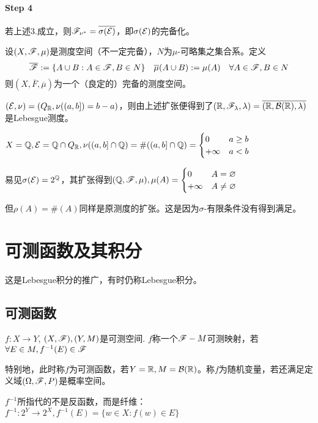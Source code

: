 \documentclass{ctexbook}
\begin{document}
\paragraph{Step 4}
\begin{Thm}
  若上述3.成立，则$\mathscr{F}_{\nu^{*}}=\overline{\sigma(\mathcal{E})}$，即$\sigma(\mathcal{E})$的完备化。
\end{Thm}

\begin{Thm}[完备化定理]
  设$(X,\mathscr{F},\mu)$是测度空间（不一定完备），$N$为$\mu$-可略集之集合系。定义
  \[\overline{\mathscr{F}}:=\{A\cup B:A\in\mathscr{F}, B\in N\}\quad  \overline{\mu}(A\cup B):=\mu(A)\quad\forall A\in\mathscr{F}, B\in N\]
  则$(X,\overline{F},\overline{\mu})$为一个（良定的）完备的测度空间。
\end{Thm}

\begin{comment}
\begin{Prop}
  $(\E,\nu)$是半环及其上的预测度，则$\nu^{*}|_{\E}=\nu$。
\end{Prop}
\end{comment}

\begin{Eg}
  $(\mathcal{E},\nu)=(Q_{\mathbb{R}},\nu((a,b])=b-a)$，则由上述扩张便得到了$(\mathbb{R},\mathscr{F}_{\lambda},\lambda)=\overline{(\mathbb{R},\mathcal{B}(\mathbb{R}),\lambda)}$是Lebesgue测度。
\end{Eg}

\begin{Eg}
  $X=\mathbb{Q}, \mathcal{E}=\mathbb{Q}\cap Q_{\mathbb{R}},\nu((a,b]\cap \mathbb{Q})=\#((a,b]\cap\mathbb{Q})=
  \begin{cases}
    0& a\geq b\\+\infty&a<b
  \end{cases}  $

  易见$\sigma(\mathcal{E})=2^{\mathbb{Q}}$，其扩张得到$(\mathbb{Q},\mathscr{F},\mu),\mu(A)=
  \begin{cases}
    0&A=\varnothing\\+\infty &A\neq\varnothing
  \end{cases}  $

  但$\rho(A)=\#(A)$同样是原测度的扩张。这是因为$\sigma$-有限条件没有得到满足。
\end{Eg}

\section{可测函数及其积分}

这是Lebesgue积分的推广，有时仍称Lebesgue积分。
\subsection{可测函数}
\begin{Def}[可测映射]
  $f:X\to Y$, $(X,\mathscr{F}),(Y,M)$是可测空间. $f$称一个$\mathscr{F}-M$可测映射，若$\forall E\in M, f^{-1}(E)\in\mathscr{F}$

  特别地，此时称$f$为可测函数，若$Y=\mathbb{R},M=\mathcal{B}(\mathbb{R})$。称$f$为随机变量，若还满足定义域$(\Omega, \mathscr{F},P)$是概率空间。
\end{Def}
\begin{Rmk}
  $f^{-1}$所指代的不是反函数，而是纤维：$f^{-1}:2^{Y}\to 2^{X},f^{-1}(E)=\{w\in X:f(w)\in E\}$
\end{Rmk}
\end{document}
